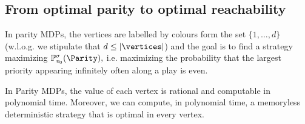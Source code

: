 \subsection*{From optimal parity to optimal reachability}

In parity MDPs, the vertices are labelled by colours form the set $\{1,\dots,d\}$ (w.l.o.g. we stipulate that $d\leq |\vertices|$) and the goal is to find a strategy maximizing $ \probm^\sigma_{\vinit}(\Parity),$ i.e. maximizing the probability that the largest priority appearing infinitely often along a play is even.

\begin{theorem}
	\label{5-thm:parity-main}
	In Parity MDPs, the value of each vertex is rational and computable in polynomial time. Moreover, we can compute, in polynomial time, a memoryless deterministic strategy that is optimal in every vertex.
\end{theorem}
